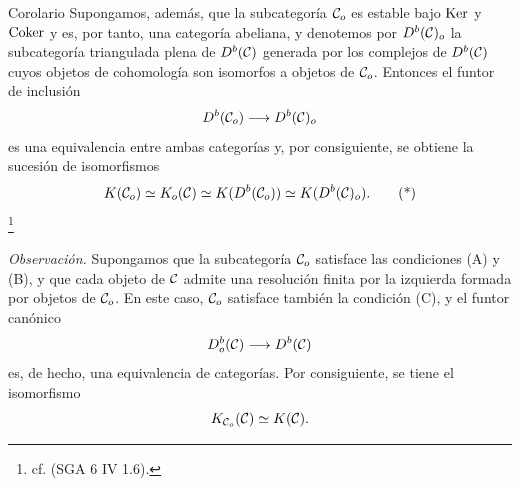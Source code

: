 \begin{statement}{Corolario}
Supongamos, además, que la subcategoría $\mathcal C_o$ es estable bajo $\operatorname{Ker}$ y $\operatorname{Coker}$ y es, por tanto, una categoría abeliana, y denotemos por $D^b(\mathcal C)_o$ la subcategoría triangulada plena de $D^b(\mathcal C)$ generada por los complejos de $D^b(\mathcal C)$ cuyos objetos de cohomología son isomorfos a objetos de $\mathcal C_o$. Entonces el funtor de inclusión
\[
D^b(\mathcal C_o)\longrightarrow D^b(\mathcal C)_o
\]
es una equivalencia entre ambas categorías y, por consiguiente, se obtiene la sucesión de isomorfismos
\[
K(\mathcal C_o)\simeq K_o(\mathcal C)\simeq K(D^b(\mathcal C_o))\simeq K(D^b(\mathcal C)_o).
\tag{*}
\]
\footnote{cf. (SGA 6 IV 1.6).}
\end{statement}

\emph{Observación.} Supongamos que la subcategoría $\mathcal C_o$ satisface las condiciones (A) y (B), y que cada objeto de $\mathcal C$ admite una resolución finita por la izquierda formada por objetos de $\mathcal C_o$. En este caso, $\mathcal C_o$ satisface también la condición (C), y el funtor canónico
\[
D_o^b(\mathcal C)\longrightarrow D^b(\mathcal C)
\]
es, de hecho, una equivalencia de categorías. Por consiguiente, se tiene el isomorfismo
\[
K_{\mathcal C_o}(\mathcal C)\simeq K(\mathcal C).
\]
